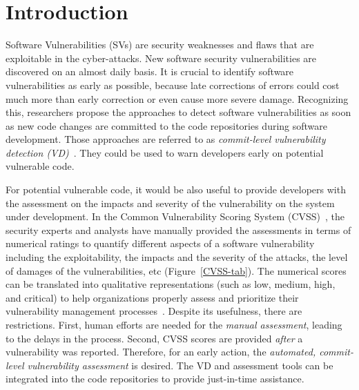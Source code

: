 \section{Introduction}
\label{intro:sec}

Software Vulnerabilities (SVs) are security weaknesses and flaws that
are exploitable in the cyber-attacks. New software security
vulnerabilities are discovered on an almost daily basis. It is crucial
to identify software vulnerabilities as early as possible, because
late corrections of errors could cost much more than early correction
or even cause more severe damage. Recognizing this, researchers
propose the approaches to detect software vulnerabilities as soon as
new code changes are committed to the code repositories during
software development. Those approaches are referred to as {\em
  commit-level vulnerability detection
  (VD)}~\cite{perl2015vccfinder,zhou2017automated,chen2019large}. They
could be used to warn developers early on potential vulnerable code.

For potential vulnerable code, it would be also useful to provide
developers with the assessment on the impacts and severity of the
vulnerability on the system under development. In the Common
Vulnerability Scoring System (CVSS)~\cite{first-website}, the security
experts and analysts have manually provided the assessments in terms
of numerical ratings to quantify different aspects of a software
vulnerability including the exploitability, the impacts and the
severity of the attacks, the level of damages of the vulnerabilities,
etc (Figure~\ref{CVSS-tab}). The numerical scores can be translated
into qualitative representations (such as low, medium, high, and
critical) to help organizations properly assess and prioritize their
vulnerability management processes~\cite{first-website}. Despite its
usefulness, there are restrictions. First, human efforts are needed
for the {\em manual assessment}, leading to the delays in the process.
Second, CVSS scores are provided {\em after} a vulnerability was
reported. Therefore, for an early action, the {\em automated,
  commit-level vulnerability assessment} is desired. The VD and
assessment tools can be integrated into the code repositories to
provide just-in-time assistance.


